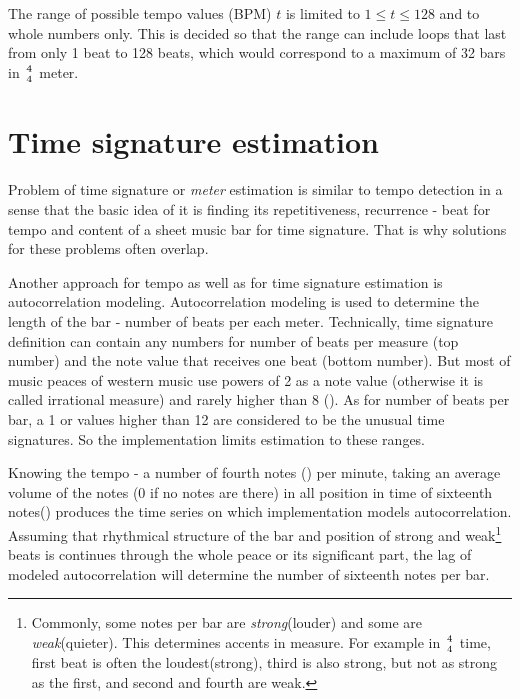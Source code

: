 The range of possible tempo values (\ac{BPM}) $t$ is limited to $1 \le t \le 128$ and to whole numbers only. This is
decided so that the range can include loops that last from only 1 beat to 128 beats, which would correspond to a maximum
of 32 bars in $4\atop4$ meter.

\section{Time signature estimation}\label{sec:time-signature-estimation}
Problem of time signature or \textit{meter} estimation is similar to tempo detection in a sense that the basic idea of
it is finding its repetitiveness, recurrence - beat for tempo and content of a sheet music bar for time signature. That
is why solutions for these problems often overlap.

Another approach for tempo as well as for time signature estimation is autocorrelation modeling. Autocorrelation
modeling is used to determine the length of the bar - number of beats per each meter. Technically, time signature
definition can contain any numbers for number of beats per measure (top number) and the note value that receives one
beat (bottom number). But most of music peaces of western music use powers of 2 as a note value (otherwise it is called
irrational measure) and rarely higher than 8 (\Acht). As for number of beats per bar, a 1 or values higher than 12 are
considered to be the unusual time signatures. So the implementation limits estimation to these ranges.

Knowing the tempo - a number of fourth notes (\Vier) per minute, taking an average volume of the notes (0 if no notes
are there) in all position in time of sixteenth notes(\Sech) produces the time series on which implementation models
autocorrelation. Assuming that rhythmical structure of the bar and position of strong and weak\footnote{Commonly, some
notes per bar are \textit{strong}(louder) and some are \textit{weak}(quieter). This determines accents in measure. For
example in $4\atop4$ time, first beat is often the loudest(strong), third is also strong, but not as strong as
the first, and second and fourth are weak.} beats is continues through the whole peace or its significant part, the lag
of modeled autocorrelation will determine the number of sixteenth notes per bar.

